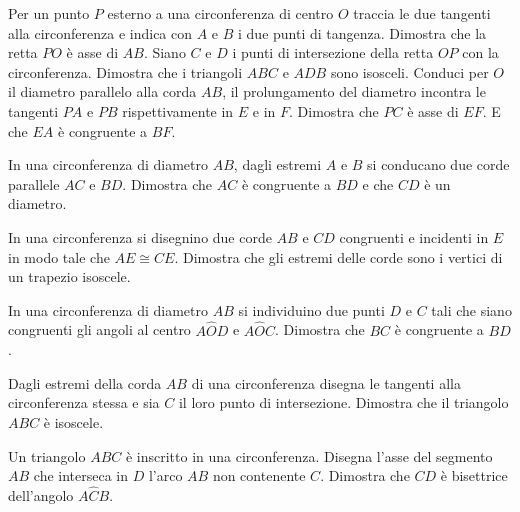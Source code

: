 \begin{multicols}{2}
\begin{esercizio}
\label{ese:5.33}
Per un punto \(P\) esterno a una circonferenza di centro \(O\) traccia le 
due tangenti alla circonferenza e indica con \(A\) e \(B\) i due punti di 
tangenza. Dimostra che la retta \(PO\) è asse di \(AB\). Siano \(C\) e \(D\) 
i punti di intersezione della retta \(OP\) con la circonferenza. 
Dimostra che i triangoli \(ABC\) e \(ADB\) sono isosceli. Conduci per \(O\) 
il diametro parallelo alla corda \(AB\), il prolungamento del diametro 
incontra le tangenti \(PA\) e \(PB\) rispettivamente in \(E\) e in \(F\). 
Dimostra che \(PC\) è asse di \(EF\). E che \(EA\) è congruente a \(BF\).
\end{esercizio}

\begin{esercizio}
\label{ese:5.34}
In una circonferenza di diametro \(AB\), dagli estremi \(A\) e \(B\) si 
conducano due corde parallele \(AC\) e \(BD\). Dimostra che \(AC\) è 
congruente a \(BD\) e che \(CD\) è un diametro.
\end{esercizio}

\begin{esercizio}
\label{ese:5.35}
In una circonferenza si disegnino due corde \(AB\) e \(CD\) congruenti e 
incidenti in \(E\) in modo tale che \(AE\cong CE\). Dimostra che gli 
estremi delle corde sono i vertici di un trapezio isoscele.
\end{esercizio}

\begin{esercizio}
\label{ese:5.36}
In una circonferenza di diametro \(AB\) si individuino due punti \(D\) e 
\(C\) tali che siano congruenti gli angoli al centro \(A\widehat{O}D\) e 
\(A\widehat{O}C\). Dimostra che \(BC\) è congruente a \(BD\).
\end{esercizio}

\begin{esercizio}
\label{ese:5.37}
Dagli estremi della corda \(AB\) di una circonferenza disegna le 
tangenti alla circonferenza stessa e sia \(C\) il loro punto di 
intersezione. Dimostra che il triangolo \(ABC\) è isoscele.
\end{esercizio}

\begin{esercizio}
\label{ese:5.38}
Un triangolo \(ABC\) è inscritto in una circonferenza. Disegna l'asse 
del segmento \(AB\) che interseca in \(D\) l'arco \(AB\) non contenente 
\(C\). Dimostra che \(CD\) è bisettrice dell'angolo \(A\widehat{C}B\).
\end{esercizio}


\end{multicols}
